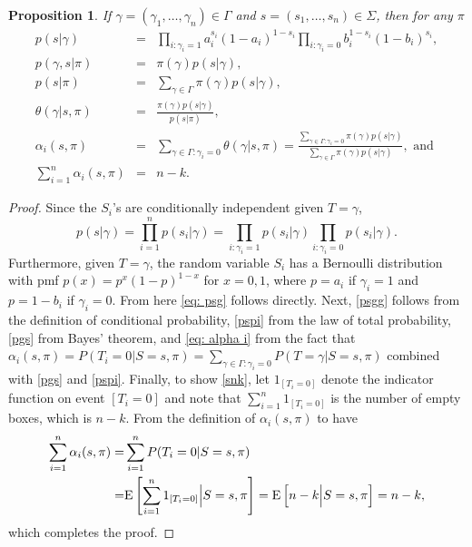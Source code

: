 \documentclass[10pt,a4paper]{amsart}
\newtheorem{prop}{Proposition}
\begin{document}
\begin{prop}\label{Prop1} If $\gamma=(\gamma_1,\dots,\gamma_n) \in \Gamma$ and $s=(s_1,\dots,s_n)\in\Sigma$, then for any $\pi$
\begin{eqnarray}
p(s|\gamma)&=&\prod_{i: \gamma_i=1}a_i^{s_i}(1-a_i)^{1-s_i}\prod_{i: \gamma_i=0}b_i^{1-s_i}(1-b_i)^{s_i}, \label{eq: psg}\\
p(\gamma,s|\pi)&=&\pi(\gamma)p(s|\gamma),       \label{psgg}\\
p(s|\pi)&=&\sum_{\gamma\in \Gamma}\pi(\gamma)p(s|\gamma),       \label{pspi}\\
\theta(\gamma|s,\pi) &=&\frac{\pi(\gamma)p(s|\gamma)}{p(s|\pi)} , \label{pgs}\\
\alpha_i(s,\pi)&=& \sum_{\gamma\in\Gamma: \gamma_i=0}\theta(\gamma |s,\pi)=
\frac{\sum\limits_{\gamma\in\Gamma: \gamma_i=0} \pi(\gamma)p(s|\gamma)}{\sum_{\gamma\in \Gamma}\pi(\gamma)p(s|\gamma)}, \mbox{ and }\label{eq: alpha i}\\
\sum_{i=1}^n\alpha_i(s,\pi) &=& n-k. \label{snk}
\end{eqnarray}
\end{prop}

\begin{proof}
Since the $S_i$'s are conditionally independent given $T=\gamma$,
$$
p(s|\gamma)=\prod_{i=1}^{n}p(s_i|\gamma)=\prod_{i: \gamma_i=1}p(s_i|\gamma)\prod_{i: \gamma_i=0}p(s_i|\gamma).
$$
Furthermore, given $T=\gamma$, the random variable $S_i$ has a Bernoulli distribution with pmf $p(x)=p^x(1-p)^{1-x}$ for $x=0,1$, where $p=a_i$ if $\gamma_i=1$ and $p=1-b_i$ if $\gamma_i=0$. From here \eqref{eq: psg} follows directly. Next, \eqref{psgg} follows from the definition of conditional probability, \eqref{pspi} from the law of total probability, \eqref{pgs} from Bayes' theorem, and \eqref{eq: alpha i} from the fact that $\alpha_i(s,\pi)= P(T_i=0 |S=s,\pi)=\sum_{\gamma\in\Gamma: \gamma_i=0}P(T=\gamma|S=s,\pi)$ combined with \eqref{pgs} and \eqref{pspi}. Finally, to show \eqref{snk}, let $1_{[T_i=0]}$ denote the indicator function on event $[T_i=0]$ and note that $\sum_{i=1}^n 1_{[T_i=0]}$ is the number of empty boxes, which is $n-k$. From the definition of $\alpha_i(s,\pi)$ to have
\[
\begin{aligned}
\sum_{i=1}^n\alpha_i(s,\pi)=&
\sum_{i=1}^n P(T_i=0 |S=s,\pi)\\
=&\mathrm E\left[\sum_{i=1}^n 1_{[T_i=0]}\Big{|}S= s,\pi\right] = \mathrm E\left[ n-k\Big{|} S=s,\pi\right] = n-k,
\end{aligned}
\]
which completes the proof.
\end{proof}
\end{document}
